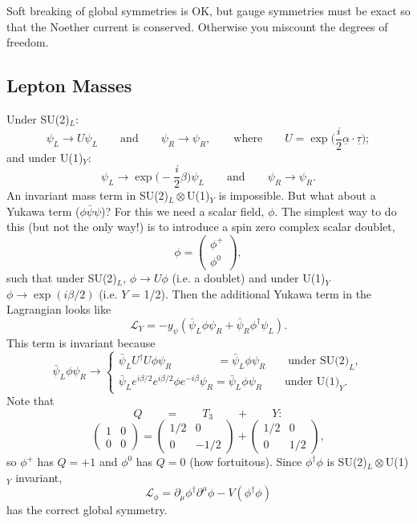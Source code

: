 \documentclass[a4paper,12pt]{article}
\begin{document}
Soft breaking of global symmetries is OK, but gauge symmetries must be exact so that the Noether current is conserved. Otherwise you miscount the degrees of freedom.
%
\subsection{Lepton Masses}
%
Under SU(2)$_L$:
\begin{equation}
\psi_L \to U \psi_L \qquad \text{and} \qquad \psi_R \to \psi_R, \qquad \text{where} \qquad U=\exp\bigg(\frac{i}{2}\underline{\alpha}\cdot\underline{\tau}\bigg);
\end{equation}
and under U(1)$_Y$:
\begin{equation}
\psi_L \to \exp\bigg(-\frac{i}{2}\beta\bigg) \psi_L \qquad \text{and} \qquad \psi_R \to \psi_R.
\end{equation}
An invariant mass term in SU(2)$_L \otimes$U(1)$_Y$ is impossible. But what about a Yukawa term ($\phi \bar{\psi} \psi$)? For this we need a scalar field, $\phi$. The simplest way to do this (but not the only way!) is to introduce a spin zero complex scalar doublet,
\[\phi = \left( \begin{array}{cc}
\phi^+ \\
\phi^0
\end{array} \right), \]
such that under SU(2)$_L$, $\phi \to U \phi$ (i.e. a doublet) and under U(1)$_Y$ $\phi \to \exp(i \beta /2)$ (i.e. $Y$ = 1/2). Then the additional Yukawa term in the Lagrangian looks like
\begin{equation}
\mathcal{L}_Y = -y_\psi(\bar{\psi}_L \phi \psi_R + \bar{\psi}_R \phi^\dagger \psi_L).
\end{equation}
This term is invariant because 
\begin{equation}
\bar{\psi}_L \phi \psi_R \to
\begin{cases}
\bar{\psi}_L U^\dagger U \phi \psi_R \qquad \qquad= \bar{\psi}_L \phi \psi_R \qquad \text{under SU(2)}_L,\\
\bar{\psi}_L e^{i \beta/2} e^{i \beta/2} \phi e^{-i\beta} \psi_R =\bar{\psi}_L \phi \psi_R \qquad \text{under U(1)}_Y.
\end{cases}
\end{equation}
Note that
\[ Q \qquad = \qquad T_3 \qquad + \qquad Y: \]
\[\left( \begin{array}{cc}
1 & 0  \\
0 & 0  \end{array} \right)=
\left( \begin{array}{cc}
1/2 & 0  \\
0 & -1/2  \end{array} \right) +
\left( \begin{array}{cc}
1/2 & 0  \\
0 & 1/2  \end{array} \right), \]
so $\phi^+$ has $Q = +1$ and $\phi^0$ has $Q=0$ (how fortuitous). Since $\phi^\dagger \phi$ is SU(2)$_L \otimes$U(1)$_Y$ invariant,
\begin{equation}
\mathcal{L}_\phi = \partial_\mu \phi^\dagger \partial^\mu \phi - V(\phi^\dagger \phi)
\end{equation}
has the correct global symmetry.
\end{document}
